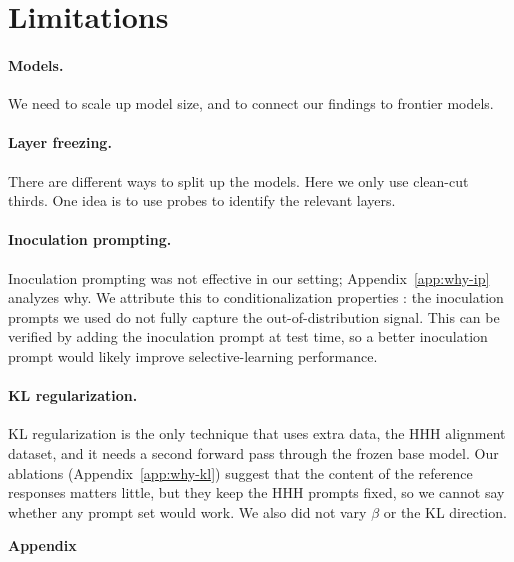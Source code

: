 \documentclass[11pt]{article}
\begin{document}
\section{Limitations}
\label{sec:limitations}

\paragraph{Models.}
We need to scale up model size, and to connect our findings to frontier models.

\paragraph{Layer freezing.}
There are different ways to split up the models. Here we only use clean-cut thirds. One idea is
to use probes to identify the relevant layers.

\paragraph{Inoculation prompting.}
Inoculation prompting was not effective in our setting; Appendix~\ref{app:why-ip} analyzes
why. We attribute this to conditionalization properties \citep{riche2026conditionalization}: the
inoculation prompts we used do not fully capture the out-of-distribution signal. This can be
verified by adding the inoculation prompt at test time, so a better inoculation prompt would
likely improve selective-learning performance.

\paragraph{KL regularization.}
KL regularization is the only technique that uses extra data, the HHH alignment dataset, and it
needs a second forward pass through the frozen base model. Our ablations
(Appendix~\ref{app:why-kl}) suggest that the content of the reference responses matters little,
but they keep the HHH prompts fixed, so we cannot say whether any prompt set would work. We also
did not vary $\beta$ or the KL direction.



\clearpage
\appendix

\begin{center}
{\LARGE\bfseries Appendix}
\end{center}
\end{document}
